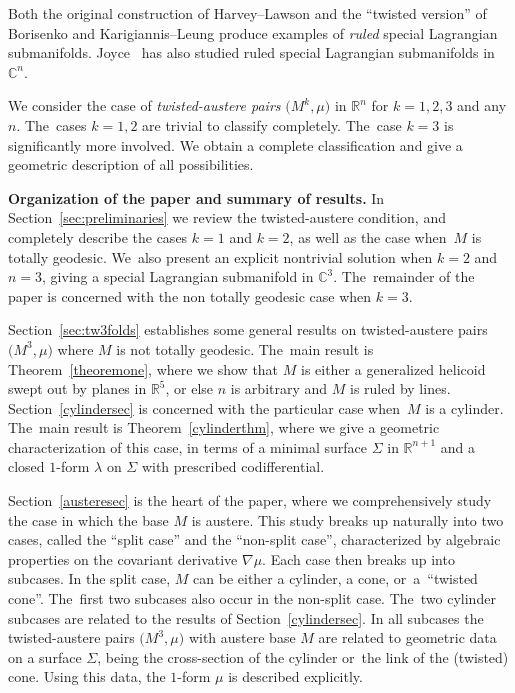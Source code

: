 \documentclass[pdftex]{sigma}
\def\R{\mathbb{R}}
\def\C{\mathbb{C}}
\numberwithin{equation}{section}
\begin{document}
Both the original construction of Harvey--Lawson and the ``twisted version'' of Borisenko and Karigiannis--Leung produce examples of \emph{ruled} special Lagrangian submanifolds. Joyce~\cite{J-ruled} has also studied ruled special Lagrangian submanifolds in $\C^n$.

We consider the case of \emph{twisted-austere pairs} $\big(M^k, \mu\big)$ in $\R^n$ for $k=1,2,3$ and any $n$. The~cases $k=1,2$ are trivial to classify completely. The~case $k=3$ is significantly more involved. We obtain a complete classification and give a geometric description of all possibilities.

\textbf{Organization of the paper and summary of results.} In Section~\ref{sec:preliminaries} we review the twisted-austere condition, and completely describe the cases $k=1$ and $k=2$, as well as the case when~$M$ is totally geodesic. We~also present an explicit nontrivial solution when $k=2$ and $n=3$, giving a special Lagrangian submanifold in $\C^3$. The~remainder of the paper is concerned with the non totally geodesic case when $k=3$.

Section~\ref{sec:tw3folds} establishes some general results on twisted-austere pairs $\big(M^3, \mu\big)$ where $M$ is not totally geodesic. The~main result is Theorem~\ref{theoremone}, where we show that $M$ is either a generalized helicoid swept out by planes in $\R^5$, or else $n$ is arbitrary and $M$ is ruled by lines. Section~\ref{cylindersec} is concerned with the particular case when~$M$ is a cylinder. The~main result is Theorem~\ref{cylinderthm}, where we give a geometric characterization of this case, in terms of a minimal surface $\Sigma$ in $\R^{n+1}$ and a closed $1$-form $\lambda$ on $\Sigma$ with prescribed codifferential.

Section~\ref{austeresec} is the heart of the paper, where we comprehensively study the case in which the base $M$ is austere. This study breaks up naturally into two cases, called the ``split case'' and the ``non-split case'', characterized by algebraic properties on the covariant derivative $\nabla \mu$. Each case then breaks up into subcases. In the split case, $M$ can be either a cylinder, a cone, or~a~``twisted cone''. The~first two subcases also occur in the non-split case. The~two cylinder subcases are related to the results of Section~\ref{cylindersec}. In all subcases the twisted-austere pairs $\big(M^3, \mu\big)$ with austere base $M$ are related to geometric data on a surface $\Sigma$, being the cross-section of the cylinder or~the link of the (twisted) cone. Using this data, the $1$-form $\mu$ is described explicitly.
\end{document}
